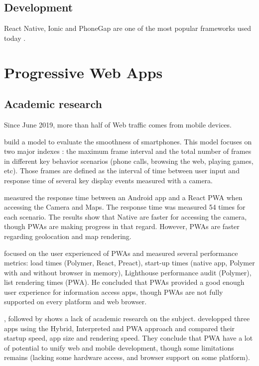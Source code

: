 \subsection{Development}

React Native, Ionic and PhoneGap are one of the most popular frameworks used today \cite{CrossPlatform_study}.

\section{Progressive Web Apps}
\subsection{Academic research}

Since June 2019, more than half of Web traffic comes from mobile devices. \cite{WebTrafficData}

    \cite{smoothnessQoE} build a model to evaluate the smoothness of smartphones. This model focuses on two major indexes : the maximum frame interval and the total number of frames in different key behavior scenarios (phone calls, browsing the web, playing games, etc). Those frames are defined as the interval of time between user input and response time of several key display events measured with a camera. %
    
    \cite{PWAbc_responsetime} measured the response time between an Android app and a React PWA when accessing the Camera and Maps. The response time was measured 54 times for each scenario. The results show that Native are faster for accessing the camera, though PWAs are making progress in that regard. However, PWAs are faster regarding geolocation and map rendering.
    
    \cite{YbergViktor2018NPaU} focused on the user experienced of PWAs and measured several performance metrics: load times (Polymer, React, Preact), start-up times (native app, Polymer with and without browser in memory), Lighthouse performance audit (Polymer), list rendering times (PWA). He concluded that PWAs provided a good enough user experience for information access apps, though PWAs are not fully supported on every platform and web browser.
    
    \cite{PWApossibleUnifer}, followed by \cite{Biorn-Hansen2} shows a lack of academic research on the subject. \cite{PWApossibleUnifer} developped three apps using the Hybrid, Interpreted and PWA approach and compared their startup speed, app size and rendering speed. They conclude that PWA have a lot of potential to unify web and mobile development, though some limitations remains (lacking some hardware access, and browser support on some platform).
    
